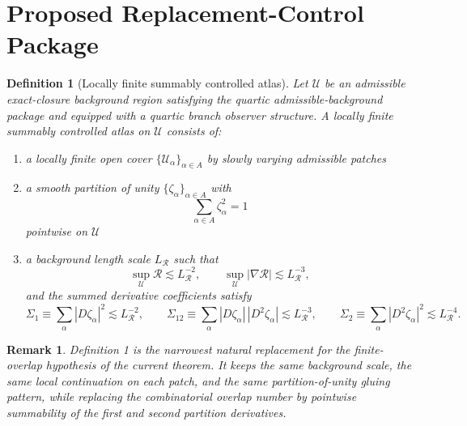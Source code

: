 \documentclass[11pt]{article}
\newtheorem{definition}{Definition}
\newtheorem{remark}{Remark}
\begin{document}
\section{Proposed Replacement-Control Package}

\begin{definition}[Locally finite summably controlled atlas]
Let \(\mathcal U\) be an admissible exact-closure background region satisfying the quartic admissible-background package and equipped with a quartic branch observer structure. A \emph{locally finite summably controlled atlas} on \(\mathcal U\) consists of:
\begin{enumerate}
    \item a locally finite open cover \(\{\mathcal U_\alpha\}_{\alpha\in A}\) by slowly varying admissible patches
    \item a smooth partition of unity \(\{\zeta_\alpha\}_{\alpha\in A}\) with
    \begin{equation}
    \sum_{\alpha\in A}\zeta_\alpha^2=1
    \label{eq:partitionunity}
    \end{equation}
    pointwise on \(\mathcal U\)
    \item a background length scale \(L_{\mathcal R}\) such that
    \begin{equation}
    \sup_{\mathcal U}\mathcal R \lesssim L_{\mathcal R}^{-2},
    \qquad
    \sup_{\mathcal U}|\nabla\mathcal R| \lesssim L_{\mathcal R}^{-3},
    \label{eq:LR}
    \end{equation}
    and the summed derivative coefficients satisfy
    \begin{equation}
    \Sigma_1 \equiv \sum_\alpha |D\zeta_\alpha|^2 \lesssim L_{\mathcal R}^{-2},
    \qquad
    \Sigma_{12} \equiv \sum_\alpha |D\zeta_\alpha|\,|D^2\zeta_\alpha| \lesssim L_{\mathcal R}^{-3},
    \qquad
    \Sigma_2 \equiv \sum_\alpha |D^2\zeta_\alpha|^2 \lesssim L_{\mathcal R}^{-4}.
    \label{eq:summablebounds}
    \end{equation}
\end{enumerate}
\end{definition}

\begin{remark}
Definition 1 is the narrowest natural replacement for the finite-overlap hypothesis of the current theorem. It keeps the same background scale, the same local continuation on each patch, and the same partition-of-unity gluing pattern, while replacing the combinatorial overlap number by pointwise summability of the first and second partition derivatives.
\end{remark}
\end{document}
